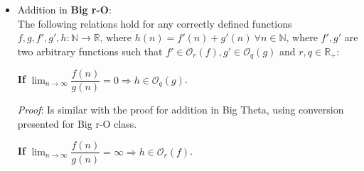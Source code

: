 \begin{itemize}
    \begin{theorem}
        \textbf{If} $ \lim_{n\to\infty} \dfrac{f(n)}{g(n)} = t, \ t \in \mathbb{R}_{+} \Rightarrow  h \in \Theta_{r} \left( f + \dfrac{r}{q} \cdot g \right) $. \\
    \end{theorem}
    \begin{proof}

        $ \lim_{n\to\infty} \dfrac{f(n)}{g(n)} = t \Rightarrow \lim_{n\to\infty} \dfrac{f'(n)}{g'(n)} = t \cdot \dfrac{r}{q} = t' \Rightarrow \lim_{n\to\infty} \dfrac{g'(n) + f'(n)}{g'(n)} = t' + 1 $ and using the result from asymptotic analysis section, we have $ g'(n) + f'(n) = h(n) \in \Theta_{t' + 1}(g')$. \\
        Using reflexivity property, $ h(n) \in \Theta_{t' + 1} (q \cdot g)$. \\
        Using the conversion technique, we have $ h(n) \in \Theta_{r}( \dfrac{1}{r} \cdot t \cdot \dfrac{r}{q} + 1) \cdot q \cdot g)$. \\
        By swapping back $t$, asymptotically, we can establish: $ h(n) \in \Theta_{r} \left( \dfrac{1}{r} \cdot ( \dfrac{f(n)}{g(n)} \cdot \dfrac{r}{q} + 1) \cdot q \cdot g \right) $ \\
        Therefore $ h \in \Theta_{r} \left( f + \dfrac{r}{q} \cdot g \right) $.
    \end{proof}



    \item Addition in \textbf{Big r-O}: \\
    The following relations hold for any correctly defined functions $f, g, f', g', h:\mathbb{N}\longrightarrow\mathbb{R}$, where $ h(n) = f'(n) + g'(n)\  \forall n \in \mathbb{N} $, where $f',g'$ are two arbitrary functions such that $ f' \in \mathcal{O}_{r}(f), g' \in \mathcal{O}_{q}(g) $ and $r,q \in \mathbb{R}_{+}$:
    \begin{theorem}
        \textbf{If} $ \lim_{n\to\infty} \dfrac{f(n)}{g(n)} = 0 \Rightarrow  h \in \mathcal{O}_{q}(g) $. \\
    \end{theorem}

    \textit{Proof}:
    Is similar with the proof for addition in Big Theta, using conversion presented for Big r-O class.
    \hfill\break

    \begin{theorem}
        \textbf{If} $ \lim_{n\to\infty} \dfrac{f(n)}{g(n)} = \infty \Rightarrow  h \in \mathcal{O}_{r}(f) $. \\
    \end{theorem}


\end{itemize}
